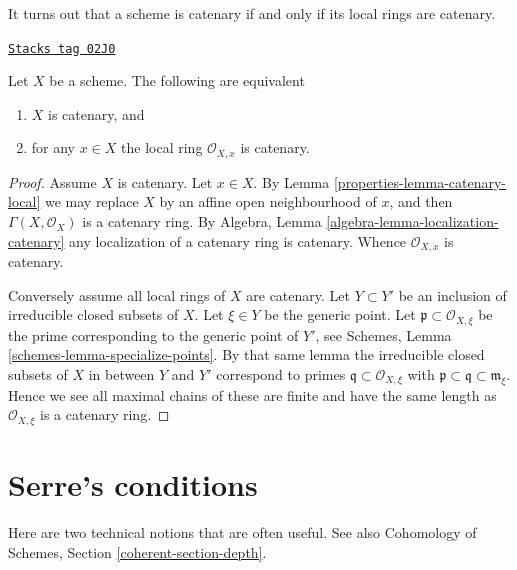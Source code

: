 It turns out that a scheme is catenary if and only if its local
rings are catenary.

\begin{lemma}
\label{properties-lemma-catenary-local-rings-catenary}
\href{https://stacks.math.columbia.edu/tag/02J0}{\texttt{Stacks tag 02J0}}

Let $X$ be a scheme. The following are equivalent
\begin{enumerate}
\item $X$ is catenary, and
\item for any $x \in X$ the local ring $\mathcal{O}_{X, x}$ is
catenary.
\end{enumerate}
\end{lemma}

\begin{proof}

Assume $X$ is catenary. Let $x \in X$. By Lemma \ref{properties-lemma-catenary-local}
we may replace $X$ by an affine open neighbourhood of $x$, and
then $\Gamma(X, \mathcal{O}_X)$ is a catenary ring. By
Algebra, Lemma \ref{algebra-lemma-localization-catenary} any
localization of a catenary ring is
catenary. Whence $\mathcal{O}_{X, x}$ is catenary.

\medskip\noindent
Conversely assume all local rings of $X$ are catenary.
Let $Y \subset Y'$ be an inclusion of irreducible closed
subsets of $X$. Let $\xi \in Y$ be the generic point.
Let $\mathfrak p \subset \mathcal{O}_{X, \xi}$ be the prime
corresponding to the generic point of $Y'$, see
Schemes, Lemma \ref{schemes-lemma-specialize-points}. By that same
lemma the irreducible closed subsets of $X$ in between $Y$ and $Y'$
correspond to primes $\mathfrak q \subset \mathcal{O}_{X, \xi}$
with $\mathfrak p \subset \mathfrak q \subset \mathfrak m_{\xi}$.
Hence we see all maximal chains of these are finite and have the
same length as $\mathcal{O}_{X, \xi}$ is a catenary ring.
\end{proof}

\section{Serre's conditions}
\label{properties-section-Rk}
Here are two technical notions that are often useful.
See also Cohomology of Schemes, Section \ref{coherent-section-depth}.

